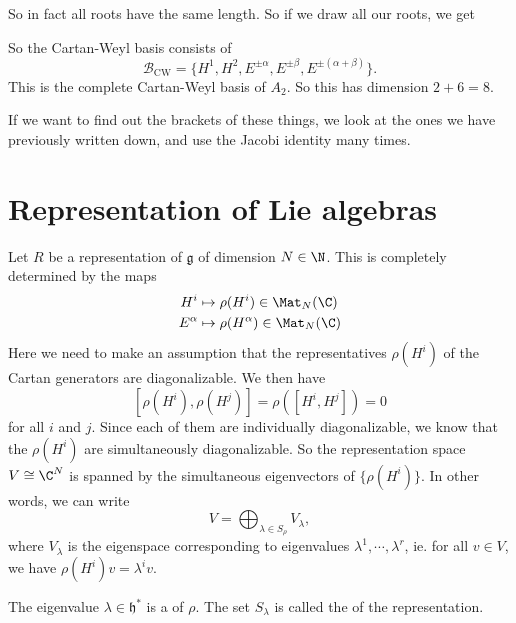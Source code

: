 \documentclass[a4paper]{article}
\begin{document}
\begin{eg}
  So in fact all roots have the same length. So if we draw all our roots, we get
  \begin{center}
  \end{center}
  So the Cartan-Weyl basis consists of
  \[
    \mathcal{B}_{\mathrm{CW}} = \{H^1, H^2, E^{\pm \alpha}, E^{\pm \beta}, E^{\pm(\alpha + \beta)}\}.
  \]
  This is the complete Cartan-Weyl basis of $A_2$. So this has dimension $2 + 6 = 8$.

  If we want to find out the brackets of these things, we look at the ones we have previously written down, and use the Jacobi identity many times.
\end{eg}

\section{Representation of Lie algebras}
Let $R$ be a representation of $\mathfrak{g}$ of dimension $N \in \N$. This is completely determined by the maps
\begin{align*}
  H^i &\mapsto \rho(H^i) \in \Mat_N(\C)\\
  E^\alpha &\mapsto \rho(H^\alpha) \in \Mat_N(\C)
\end{align*}
Here we need to make an assumption that the representatives $\rho(H^i)$ of the Cartan generators are diagonalizable. We then have
\[
  [\rho(H^i), \rho(H^j)] = \rho([H^i, H^j]) = 0
\]
for all $i$ and $j$. Since each of them are individually diagonalizable, we know that the $\rho(H^i)$ are simultaneously diagonalizable. So the representation space $V \cong \C^N$ is spanned by the simultaneous eigenvectors of $\{\rho(H^i)\}$. In other words, we can write
\[
  V = \bigoplus_{\lambda \in S_\rho} V_\lambda,
\]
where $V_\lambda$ is the eigenspace corresponding to eigenvalues $\lambda^1, \cdots, \lambda^r$, ie. for all $v \in V$, we have $\rho(H^i)v = \lambda^i v$.

The eigenvalue $\lambda \in \mathfrak{h}^*$ is a  of $\rho$. The set $S_\lambda$ is called the  of the representation.
\end{document}
